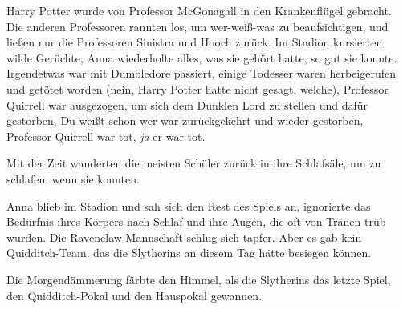 Harry Potter wurde von Professor McGonagall in den Krankenflügel gebracht.
Die anderen Professoren rannten los, um wer-weiß-was zu beaufsichtigen, und ließen nur die Professoren Sinistra und Hooch zurück. Im Stadion kursierten wilde Gerüchte; Anna wiederholte alles, was sie gehört hatte, so gut sie konnte.
Irgendetwas war mit Dumbledore passiert, einige Todesser waren herbeigerufen und getötet worden (nein, Harry Potter hatte nicht gesagt, welche), Professor Quirrell war ausgezogen, um sich dem Dunklen Lord zu stellen und dafür gestorben, Du-weißt-schon-wer war zurückgekehrt und wieder gestorben, Professor Quirrell war tot, \emph{ja} er war tot.

Mit der Zeit wanderten die meisten Schüler zurück in ihre Schlafsäle, um zu schlafen, wenn sie konnten.

Anna blieb im Stadion und sah sich den Rest des Spiels an, ignorierte das Bedürfnis ihres Körpers nach Schlaf und ihre Augen, die oft von Tränen trüb wurden.
Die Ravenclaw-Mannschaft schlug sich tapfer. Aber es gab kein Quidditch-Team, das die Slytherins an diesem Tag hätte besiegen können.

Die Morgendämmerung färbte den Himmel, als die Slytherins das letzte Spiel, den Quidditch-Pokal und den Hauspokal gewannen.

